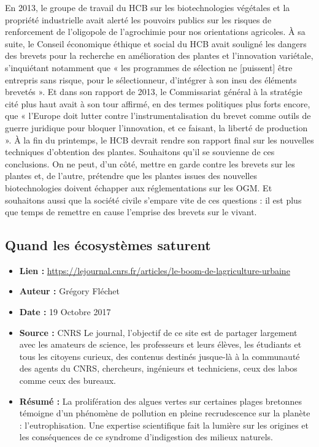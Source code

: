 \documentclass[8pt]{article}
\begin{document}
En 2013, le groupe de travail du HCB sur
les biotechnologies végétales et la propriété
industrielle avait alerté les pouvoirs publics
sur les risques de renforcement de l’oligopole de l’agrochimie pour nos orientations
agricoles. À sa suite, le Conseil économique
éthique et social du HCB avait souligné les
dangers des brevets pour la recherche en
amélioration des plantes et l’innovation
variétale, s’inquiétant notamment que « les
programmes de sélection ne [puissent] être
entrepris sans risque, pour le sélectionneur,
d’intégrer à son insu des éléments brevetés ».
Et dans son rapport de 2013, le Commissariat
général à la stratégie cité plus haut avait à son
tour affirmé, en des termes politiques plus
forts encore, que « l’Europe doit lutter contre
l’instrumentalisation du brevet comme outils
de guerre juridique pour bloquer l’innovation,
et ce faisant, la liberté de production ». À la
fin du printemps, le HCB devrait rendre son
rapport final sur les nouvelles techniques
d’obtention des plantes. Souhaitons qu’il se
souvienne de ces conclusions. On ne peut,
d’un côté, mettre en garde contre les brevets
sur les plantes et, de l’autre, prétendre que les
plantes issues des nouvelles biotechnologies
doivent échapper aux réglementations sur
les OGM. Et souhaitons aussi que la société
civile s’empare vite de ces questions : il est
plus que temps de remettre en cause l’emprise
des brevets sur le vivant.

\newpage
\subsection{Quand les écosystèmes saturent}
\label{sec:saturation}

\begin{itemize}
	\item \textbf{Lien : }  \url{https://lejournal.cnrs.fr/articles/le-boom-de-lagriculture-urbaine} 
	\item \textbf{Auteur : } Grégory Fléchet
	\item \textbf{Date : }  19 Octobre 2017
	\item \textbf{Source : } CNRS Le journal, l'objectif de ce site est de partager largement avec les amateurs de science, les professeurs et leurs élèves, les étudiants et tous les citoyens curieux, des contenus destinés jusque-là à la communauté des agents du CNRS, chercheurs, ingénieurs et techniciens, ceux des labos comme ceux des bureaux.
	\item \textbf{Résumé : }
	 La prolifération des algues vertes sur certaines plages bretonnes témoigne d’un phénomène de pollution en pleine recrudescence sur la planète : l’eutrophisation. Une expertise scientifique fait la lumière sur les origines et les conséquences de ce syndrome d’indigestion des milieux naturels. 
\end{itemize}
\end{document}

